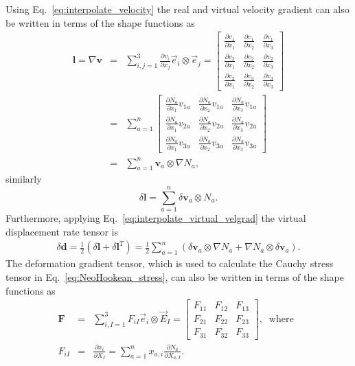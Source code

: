 Using Eq.\ \eqref{eq:interpolate_velocity} the real and virtual velocity gradient can also be written in terms of the shape functions as
%
\begin{eqnarray}
\pmb{l} = \nabla \pmb{v} &=& \sum_{i,j=1}^3 \frac{\partial v_i}{\partial x_j} \vec{e}_i \otimes \vec{e}_j = \begin{bmatrix}
\frac{\partial v_1}{\partial x_1} & \frac{\partial v_1}{\partial x_2} & \frac{\partial v_1}{\partial x_3} \\
\frac{\partial v_2}{\partial x_1} & \frac{\partial v_2}{\partial x_2} & \frac{\partial v_2}{\partial x_3} \\
\frac{\partial v_3}{\partial x_1} & \frac{\partial v_3}{\partial x_2} & \frac{\partial v_3}{\partial x_3} 
\end{bmatrix} \nonumber\\
%
&=&\sum_{a=1}^n \begin{bmatrix}
\frac{\partial N_a }{\partial x_1}v_{1a} & \frac{\partial N_a}{\partial x_2}v_{1a} & \frac{\partial N_a}{\partial x_3}v_{1a} \\
\frac{\partial N_a }{\partial x_1}v_{2a} & \frac{\partial N_a}{\partial x_2}v_{2a} & \frac{\partial N_a}{\partial x_3}v_{2a} \\
\frac{\partial N_a }{\partial x_1}v_{3a} & \frac{\partial N_a}{\partial x_2}v_{3a} & \frac{\partial N_a}{\partial x_3}v_{3a} 
\end{bmatrix} \nonumber\\
%
&=& \sum_{a=1}^n \pmb{v}_a \otimes \nabla N_a,
\label{eq:interpolate_velgrad}
\end{eqnarray}
%
similarly
%
\begin{equation}
\delta \pmb{l} = \sum_{a=1}^n \delta \pmb{v}_a \otimes N_a.
\label{eq:interpolate_virtual_velgrad}
\end{equation}
%
Furthermore, applying Eq.\ \eqref{eq:interpolate_virtual_velgrad} the virtual displacement rate tensor is
%
\begin{eqnarray}
\delta \pmb{d} = \frac{1}{2}\left(\delta \pmb{l} + \delta \pmb{l}^T\right) = \frac{1}{2}\sum_{a=1}^n \left(\delta \pmb{v}_a \otimes \nabla N_a + \nabla N_a \otimes \delta \pmb{v}_a\right).
\label{eq:interpolate_displacement_rate}
\end{eqnarray}
%
The deformation gradient tensor, which is used to calculate the Cauchy stress tensor in Eq.\ \eqref{eq:NeoHookean_stress}, can also be written in terms of the shape functions as
%
\begin{eqnarray}
\pmb{F} &=& \sum_{i,I=1}^3 F_{iI}\vec{e}_i \otimes \vec{E}_I =
%
\begin{bmatrix}
F_{11} & F_{12} & F_{13} \\
F_{21} & F_{22} & F_{23} \\
F_{31} & F_{32} & F_{33}
\end{bmatrix}, \ \text{ where } \ \nonumber\\
%
F_{iI} &=& \frac{\partial x_i}{\partial X_I} = \sum_{a=1}^nx_{a,i}\frac{\partial N_a }{\partial X_{a,I}}.
\end{eqnarray}
% 


